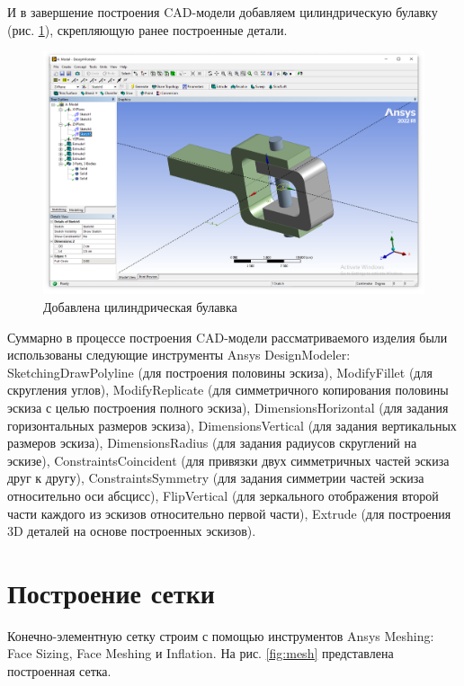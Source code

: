 И в завершение построения CAD-модели добавляем цилиндрическую булавку (рис. \ref{fig:extrude3}), скрепляющую ранее построенные детали.

\begin{figure}[H] 
	\center
	\includegraphics[width=\textwidth]{images/extrude3.png}
	\caption{Добавлена цилиндрическая булавка}
	\label{fig:extrude3}
\end{figure}

Суммарно в процессе построения CAD-модели рассматриваемого изделия были использованы следующие инструменты Ansys DesignModeler: SketchingDrawPolyline (для построения половины эскиза), ModifyFillet (для скругления углов), ModifyReplicate (для симметричного копирования половины эскиза с целью построения полного эскиза), DimensionsHorizontal (для задания горизонтальных размеров эскиза), DimensionsVertical (для задания вертикальных размеров эскиза), DimensionsRadius (для задания радиусов скруглений на эскизе), ConstraintsCoincident (для привязки двух симметричных частей эскиза друг к другу), ConstraintsSymmetry (для задания симметрии частей эскиза относительно оси абсцисс), FlipVertical (для зеркального отображения второй части каждого из эскизов относительно первой части), Extrude (для построения 3D деталей на основе построенных эскизов).

\section{Построение сетки} \label{ch2:sec2}

Конечно-элементную сетку строим с помощью инструментов Ansys Meshing: Face Sizing, Face Meshing и Inflation. На рис. \ref{fig:mesh} представлена построенная сетка.

